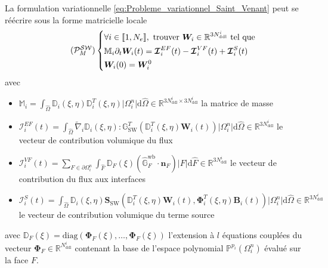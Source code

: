 \documentclass[11pt, a4paper, oneside]{report}
\begin{document}
La formulation variationnelle \eqref{eq:Probleme_variationnel_Saint_Venant} peut se réécrire sous la forme matricielle locale
\begin{equation} \tag{$\mathcal{P}_M^\mathcal{SW}$} \label{eq:Probleme_matriciel_Saint_Venant}
    \left \{
    \begin{aligned}
        & \forall i \in \llbracket 1, N_e \rrbracket, \text{ trouver } \bm{W}_i \in \mathbb{R}^{3N_\text{ddl}^i} \text{ tel que} \\
        & \mathbb{M}_i \partial_t \bm{W}_i(t) = \bm{\mathcal{I}}_i^{EF}(t) - \bm{\mathcal{I}}_i^{VF}(t) + \bm{\mathcal{I}}_i^S(t) \\
        & \bm{W}_i(0) = \bm{W}_i^0
    \end{aligned}
    \right .
\end{equation}
avec
\begin{itemize}
    \item $\displaystyle \mathbb{M}_i = \int_{\widehat{\Omega}} \mathbb{D}_i(\xi, \eta) \mathbb{D}_i^T(\xi, \eta) \lvert \Omega_i^n \rvert \text{d}\widehat{\Omega} \in \mathbb{R}^{3N_\text{ddl}^i \times 3N_\text{ddl}^i}$ la matrice de masse
    \item $\displaystyle \bm{\mathcal{I}}_i^{EF}(t) = \int_{\widehat{\Omega}} \widetilde{\nabla}_i \mathbb{D}_i(\xi, \eta) : \mathbb{G}_\text{SW}^T \left( \mathbb{D}_i^T(\xi, \eta) \bm{W}_i(t) \right) \lvert \Omega_i^n \rvert \text{d}\widehat{\Omega} \in \mathbb{R}^{3N_\text{ddl}^i}$ le vecteur de contribution volumique du flux
    \item $\displaystyle \bm{\mathcal{I}}_i^{VF}(t) = \sum_{F \in \partial \Omega_i^n} \int_{\widehat{F}} \mathbb{D}_F(\xi) \left( \widehat{\mathbb{G}}_F^\text{wb} \cdot \bm{n}_F \right) \lvert F \rvert \text{d}\widehat{F} \in \mathbb{R}^{3N_\text{ddl}^i}$ le vecteur de contribution du flux aux interfaces
    \item $\displaystyle \bm{\mathcal{I}}_i^S(t) = \int_{\widehat{\Omega}} \mathbb{D}_i(\xi, \eta) \bm{S}_\text{SW} \left( \mathbb{D}_i^T(\xi, \eta) \bm{W}_i(t), \bm{\Phi}_i^T(\xi, \eta) \bm{B}_i(t) \right) \lvert \Omega_i^n \rvert \text{d}\widehat{\Omega} \in \mathbb{R}^{3N_\text{ddl}^i}$ le vecteur de contribution volumique du terme source
\end{itemize}
avec $\mathbb{D}_F(\xi) = \text{diag} \left( \bm{\Phi}_F(\xi), \dots, \bm{\Phi}_F(\xi) \right)$ l'extension à $l$ équations couplées du vecteur $\bm{\Phi}_F \in \mathbb{R}^{N_\text{ddl}^i}$ contenant la base de l'espace polynomial $\mathbb{P}^{p_i}(\Omega_i^n)$ évalué sur la face $F$. \\
\end{document}
